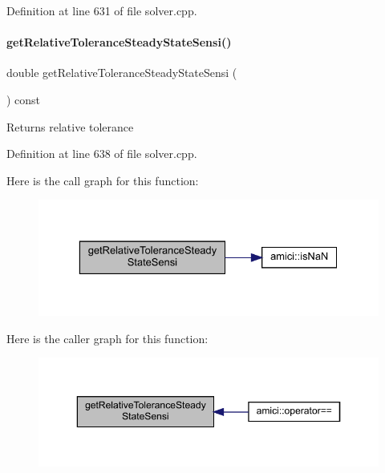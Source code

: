 Definition at line 631 of file solver.\+cpp.

\mbox{\label{classamici_1_1_solver_ac47e18a62130e7c84a8d7ceb0cb9d7eb}} 
\paragraph{\texorpdfstring{get\+Relative\+Tolerance\+Steady\+State\+Sensi()}{getRelativeToleranceSteadyStateSensi()}}
{\footnotesize\ttfamily double get\+Relative\+Tolerance\+Steady\+State\+Sensi (\begin{DoxyParamCaption}{ }\end{DoxyParamCaption}) const}

\begin{DoxyReturn}{Returns}
relative tolerance 
\end{DoxyReturn}


Definition at line 638 of file solver.\+cpp.

Here is the call graph for this function\+:
\nopagebreak
\begin{figure}[H]
\begin{center}
\leavevmode
\includegraphics[width=329pt]{classamici_1_1_solver_ac47e18a62130e7c84a8d7ceb0cb9d7eb_cgraph}
\end{center}
\end{figure}
Here is the caller graph for this function\+:
\nopagebreak
\begin{figure}[H]
\begin{center}
\leavevmode
\includegraphics[width=350pt]{classamici_1_1_solver_ac47e18a62130e7c84a8d7ceb0cb9d7eb_icgraph}
\end{center}
\end{figure}
\mbox{\label{classamici_1_1_solver_a7a324b1a30b5246828354c60c86c3583}} 
